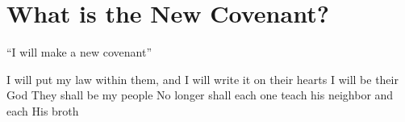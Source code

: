 \section{What is the New Covenant?}
\begin{frame}{``I will make a new covenant''}

I will put my law within them, and I will write it on their hearts
I will be their God
They shall be my people
No longer shall each one teach his neighbor and each His broth 

\end{frame}
